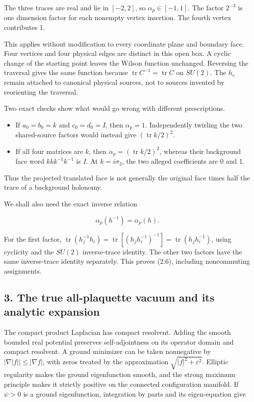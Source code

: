 \documentclass[
  11pt,
]{article}
\providecommand{\tightlist}{%
  \setlength{\itemsep}{0pt}\setlength{\parskip}{0pt}}
\begin{document}
The three traces are real and lie in \([-2,2]\), so
\(\alpha_p\in[-1,1]\). The factor \(2^{-3}\) is one dimension factor for
each nonempty vertex insertion. The fourth vertex contributes 1.

This applies without modification to every coordinate plane and boundary
face. Four vertices and four physical edges are distinct in this open
box. A cyclic change of the starting point leaves the Wilson function
unchanged. Reversing the traversal gives the same function because
\(\operatorname{tr}C^{-1}=\operatorname{tr}C\) on \(SU(2)\). The \(h_e\)
remain attached to canonical physical sources, not to sources invented
by reorienting the traversal.

Two exact checks show what would go wrong with different prescriptions.

\begin{itemize}
\tightlist
\item
  If \(a_0=b_0=k\) and \(c_0=d_0=I\), then \(\alpha_p=1\). Independently
  twirling the two shared-source factors would instead give
  \((\operatorname{tr}k/2)^2\).
\item
  If all four matrices are \(k\), then
  \(\alpha_p=(\operatorname{tr}k/2)^2\), whereas their background face
  word \(kkk^{-1}k^{-1}\) is \(I\). At \(k=i\sigma_3\), the two alleged
  coefficients are 0 and 1.
\end{itemize}

Thus the projected translated face is not generally the original face
times half the trace of a background holonomy.

We shall also need the exact inverse relation

\[
\alpha_p(h^{-1})=\alpha_p(h).
\tag{2.6}
\]

For the first factor, \(\operatorname{tr}(h_j^{-1}h_i)=
\operatorname{tr}[(h_jh_i^{-1})^{-1}]=\operatorname{tr}(h_jh_i^{-1})\),
using cyclicity and the \(SU(2)\) inverse-trace identity. The other two
factors have the same inverse-trace identity separately. This proves
(2.6), including noncommuting assignments.

\subsection{3. The true all-plaquette vacuum and its analytic
expansion}\label{magnetic-part-2-the-true-all-plaquette-vacuum-and-its-analytic-expansion}

The compact product Laplacian has compact resolvent. Adding the smooth
bounded real potential preserves self-adjointness on its operator domain
and compact resolvent. A ground minimizer can be taken nonnegative by
\(|\nabla|f||\le|\nabla f|\), with zeros treated by the approximation
\(\sqrt{|f|^2+\varepsilon^2}\). Elliptic regularity makes the ground
eigenfunction smooth, and the strong maximum principle makes it strictly
positive on the connected configuration manifold. If \(\psi>0\) is a
ground eigenfunction, integration by parts and its eigen-equation give
\end{document}
